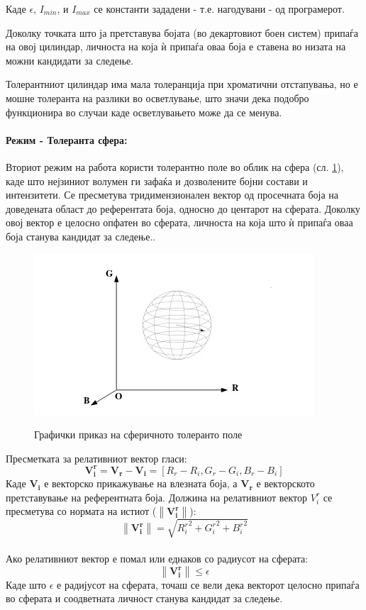 \documentclass[11pt]{article}
\newcommand\norm[1]{\left\lVert#1\right\rVert}
\renewcommand{\vec}[1]{\mathbf{#1}}
\begin{document}
        Каде $\epsilon$, $I_{min}$, и $I_{max}$ се константи зададени - т.е. нагодувани - од програмерот.

        Доколку точката што ја претставува бојата (во декартовиот боен систем) припаѓа на овој цилиндар, личноста на која ѝ припаѓа оваа боја е ставена во низата на можни кандидати за следење.

        Толерантниот цилиндар има мала толеранција при хроматични отстапувања, но е мошне толеранта на разлики во осветлување, што значи дека подобро функционира во случаи каде осветлувањето може да се менува.

      \paragraph{Режим - Толеранта сфера:\\}
        Вториот режим на работа користи толерантно поле во облик на сфера (сл. \ref{fig:sphere}), каде што нејзиниот волумен ги зафаќа и дозволените бојни состави и интензитети. Се пресметува тридимензионален вектор од просечната боја на доведената област до референтата боја, односно до центарот на сферата. Доколку овој вектор е целосно опфатен во сферата, личноста на која што ѝ припаѓа оваа боја станува кандидат за следење..
        \begin{figure}[h]
          \centering
          \includegraphics[width = 0.6\linewidth]{./images/sphere.png}
          \label{fig:sphere}
          \caption{Графички приказ на сферичното толеранто поле}
        \end{figure}
        Пресметката за релативниот вектор гласи:
        \begin{equation}
          \vec{V_i^r} = \vec{V_r} - \vec{V_i}= [R_r - R_i, G_r - G_i, B_r - B_i]
        \end{equation}
        Каде $\vec{V_i}$ е векторско прикажување на влезната боја, а $\vec{V_r}$ е векторското претставување на референтната боја.
        Должина на релативниот вектор $V_i^r$ се пресметува со нормата на истиот ($\norm{\vec{V_i^r}}$):
        \begin{equation}
        \norm{\vec{V_i^r}} = \sqrt{{R_i^r}^2 + {G_i^r}^2 + {B_i^r}^2}
        \end{equation}
        \\
        Ако релативниот вектор е помал или еднаков со радиусот на сферата:
        \begin{equation}
          \norm{\vec{V_i^r}} \leq \epsilon
        \end{equation}
        Каде што $\epsilon$ е радијусот на сферата, точаш се вели дека векторот целосно припаѓа во сферата и соодветната личност станува кандидат за следење.
\end{document}
